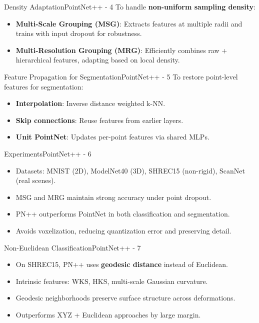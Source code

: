 \documentclass{beamer}
\begin{document}
		\begin{frame}{Density Adaptation}{PointNet++ - 4}
			To handle \textbf{non-uniform sampling density}:
			\begin{itemize}
				\item \textbf{Multi-Scale Grouping (MSG)}: Extracts features at multiple radii and trains with input dropout for robustness.
				\item \textbf{Multi-Resolution Grouping (MRG)}: Efficiently combines raw + hierarchical features, adapting based on local density.
			\end{itemize}
		\end{frame}

		\begin{frame}{Feature Propagation for Segmentation}{PointNet++ - 5}
			To restore point-level features for segmentation:
			\begin{itemize}
				\item \textbf{Interpolation}: Inverse distance weighted k-NN.
				\item \textbf{Skip connections}: Reuse features from earlier layers.
				\item \textbf{Unit PointNet}: Updates per-point features via shared MLPs.
			\end{itemize}
		\end{frame}

		\begin{frame}{Experiments}{PointNet++ - 6}
			\begin{itemize}
				\item Datasets: MNIST (2D), ModelNet40 (3D), SHREC15 (non-rigid), ScanNet (real scenes).
				\item MSG and MRG maintain strong accuracy under point dropout.
				\item PN++ outperforms PointNet in both classification and segmentation.
				\item Avoids voxelization, reducing quantization error and preserving detail.
			\end{itemize}
		\end{frame}

		\begin{frame}{Non-Euclidean Classification}{PointNet++ - 7}
			\begin{itemize}
				\item On SHREC15, PN++ uses \textbf{geodesic distance} instead of Euclidean.
				\item Intrinsic features: WKS, HKS, multi-scale Gaussian curvature.
				\item Geodesic neighborhoods preserve surface structure across deformations.
				\item Outperforms XYZ + Euclidean approaches by large margin.
			\end{itemize}
		\end{frame}
\end{document}
